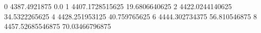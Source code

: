 0 4387.4921875 0.0
1 4407.1728515625 19.6806640625
2 4422.0244140625 34.5322265625
4 4428.251953125 40.759765625
6 4444.302734375 56.810546875
8 4457.52685546875 70.03466796875
